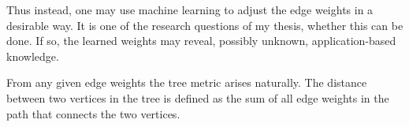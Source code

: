 Thus instead, one may use machine learning to adjust the edge weights in a desirable way.
It is one of the research questions of my thesis, whether this can be done.
If so, the learned weights may reveal, possibly unknown, application-based knowledge.

From any given edge weights the tree metric arises naturally.
The distance between two vertices in the tree is defined as the sum of all edge weights in the path that connects the two vertices.

